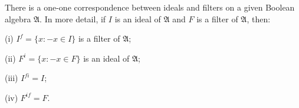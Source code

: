 There is a one-one correspondence between ideals and filters on a given Boolean algebra $\mathfrak{A}$. In more detail, if $I$ is an ideal of $\mathfrak{A}$ and $F$ is a filter of $\mathfrak{A}$, then:

(i) $I^f = \{x : -x \in I\}$ is a filter of $\mathfrak{A}$;

(ii) $F^i = \{x : -x \in F\}$ is an ideal of $\mathfrak{A}$;

(iii) $I^{fi} = I$;

(iv) $F^{if} = F$.
